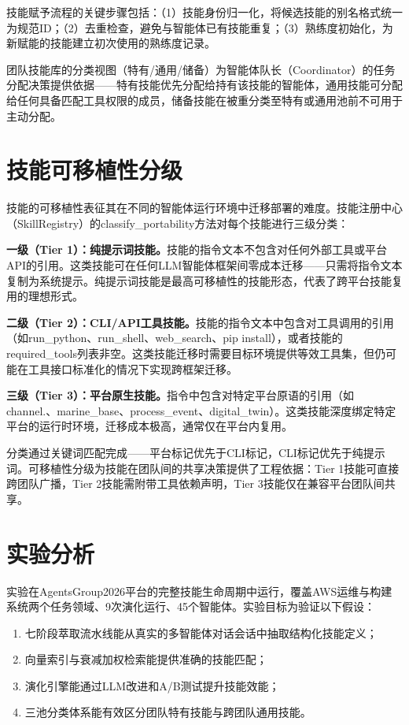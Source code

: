 \documentclass[conference]{IEEEtran}
\begin{document}
技能赋予流程的关键步骤包括：（1）技能身份归一化，将候选技能的别名格式统一为规范ID；（2）去重检查，避免与智能体已有技能重复；（3）熟练度初始化，为新赋能的技能建立初次使用的熟练度记录。

团队技能库的分类视图（特有/通用/储备）为智能体队长（Coordinator）的任务分配决策提供依据——特有技能优先分配给持有该技能的智能体，通用技能可分配给任何具备匹配工具权限的成员，储备技能在被重分类至特有或通用池前不可用于主动分配。

\section{技能可移植性分级}

技能的可移植性表征其在不同的智能体运行环境中迁移部署的难度。技能注册中心（SkillRegistry）的classify\_portability方法对每个技能进行三级分类：

\textbf{一级（Tier 1）：纯提示词技能。}技能的指令文本不包含对任何外部工具或平台API的引用。这类技能可在任何LLM智能体框架间零成本迁移——只需将指令文本复制为系统提示。纯提示词技能是最高可移植性的技能形态，代表了跨平台技能复用的理想形式。

\textbf{二级（Tier 2）：CLI/API工具技能。}技能的指令文本中包含对工具调用的引用（如run\_python、run\_shell、web\_search、pip install），或者技能的required\_tools列表非空。这类技能迁移时需要目标环境提供等效工具集，但仍可能在工具接口标准化的情况下实现跨框架迁移。

\textbf{三级（Tier 3）：平台原生技能。}指令中包含对特定平台原语的引用（如channel.、marine\_base、process\_event、digital\_twin）。这类技能深度绑定特定平台的运行时环境，迁移成本极高，通常仅在平台内复用。

分类通过关键词匹配完成——平台标记优先于CLI标记，CLI标记优先于纯提示词。可移植性分级为技能在团队间的共享决策提供了工程依据：Tier 1技能可直接跨团队广播，Tier 2技能需附带工具依赖声明，Tier 3技能仅在兼容平台团队间共享。

\section{实验分析}

实验在AgentsGroup2026平台的完整技能生命周期中运行，覆盖AWS运维与构建系统两个任务领域、9次演化运行、45个智能体。实验目标为验证以下假设：

\begin{enumerate}[nosep]
\item 七阶段萃取流水线能从真实的多智能体对话会话中抽取结构化技能定义；
\item 向量索引与衰减加权检索能提供准确的技能匹配；
\item 演化引擎能通过LLM改进和A/B测试提升技能效能；
\item 三池分类体系能有效区分团队特有技能与跨团队通用技能。
\end{enumerate}
\end{document}
